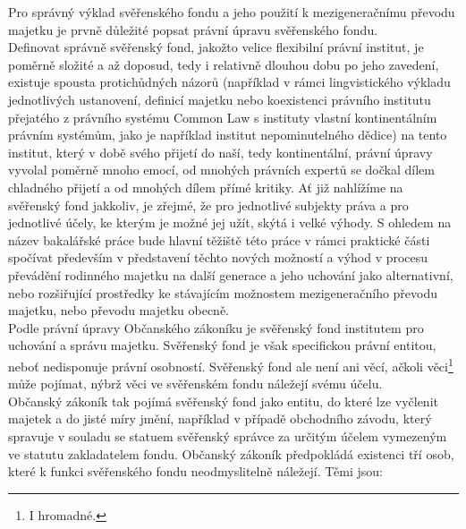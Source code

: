 \documentclass{article}
\begin{document}

Pro správný výklad svěřenského fondu a jeho použití k mezigeneračnímu převodu majetku je prvně důležité popsat právní úpravu svěřenského fondu.\\

Definovat správně svěřenský fond, jakožto velice flexibilní právní institut, je poměrně složité a až doposud, tedy i relativně dlouhou dobu po jeho zavedení, existuje spousta protichůdných názorů (například v rámci lingvistického výkladu jednotlivých ustanovení, definicí majetku nebo koexistenci právního institutu přejatého z právního systému Common Law s instituty vlastní kontinentálním právním systémům, jako je například institut nepominutelného dědice) na tento institut, který v době svého přijetí do naší, tedy kontinentální, právní úpravy vyvolal poměrně mnoho emocí, od mnohých právních expertů se dočkal dílem chladného přijetí a od mnohých dílem přímé kritiky. Ať již nahlížíme na svěřenský fond jakkoliv, je zřejmé, že pro jednotlivé subjekty práva a pro jednotlivé účely, ke kterým je možné jej užít, skýtá i velké výhody. S ohledem na název bakalářské práce bude hlavní těžiště této práce v rámci praktické části spočívat především v představení těchto nových možností a výhod v procesu převádění rodinného majetku na další generace a jeho uchování jako alternativní, nebo rozšiřující prostředky ke stávajícím možnostem mezigeneračního převodu majetku, nebo převodu majetku obecně. \\

Podle právní úpravy Občanského zákoníku je svěřenský fond institutem pro uchování a správu majetku. Svěřenský fond je však specifickou právní entitou, neboť nedisponuje právní osobností. Svěřenský fond ale není ani věcí, ačkoli věci\footnote{I hromadné.} může pojímat, nýbrž věci ve svěřenském fondu náležejí svému účelu.\\

Občanský zákoník tak pojímá svěřenský fond jako entitu, do které lze vyčlenit majetek a do jisté míry  jmění, například v případě obchodního závodu, který spravuje v souladu se statuem svěřenský správce za určitým účelem vymezeným ve statutu zakladatelem fondu. Občanský zákoník předpokládá existenci tří osob, které k funkci svěřenského fondu neodmyslitelně náležejí. Těmi jsou:\\
\end{document}
